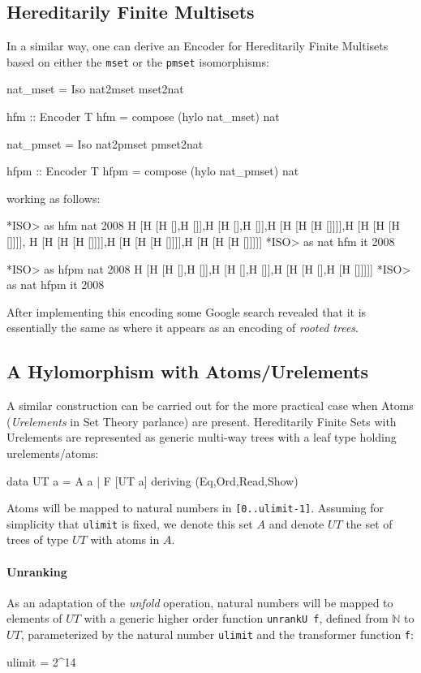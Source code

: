 \documentclass[]{INCLUDES/llncs}
\begin{document}
\subsection{Hereditarily Finite Multisets}
In a similar way, one can derive an Encoder for Hereditarily Finite Multisets
based on either the {\tt mset} or the {\tt pmset} isomorphisms:
\begin{code}
nat_mset = Iso nat2mset mset2nat

hfm :: Encoder T
hfm = compose (hylo nat_mset) nat

nat_pmset = Iso nat2pmset pmset2nat

hfpm :: Encoder T
hfpm = compose (hylo nat_pmset) nat
\end{code}
working as follows:
\begin{codex}
*ISO> as hfm nat 2008
H [H [H [],H []],H [H [],H []],H [H [H [H []]]],H [H [H [H []]]],
   H [H [H [H []]]],H [H [H [H []]]],H [H [H [H []]]]]
*ISO> as nat hfm it
2008

*ISO> as hfpm nat 2008
H [H [H [],H []],H [H [],H []],H [H [H [],H [H []]]]]
*ISO> as nat hfpm it
2008
\end{codex}
After implementing this encoding some Google search revealed that it is
essentially the same as \cite{DBLP:journals/jct/Gobel80} where
it appears as an encoding of {\em rooted trees}.

\subsection{A Hylomorphism with Atoms/Urelements}
A similar construction can be carried out for the
more practical case when Atoms ({\em Urelements}
in Set Theory parlance) are present.
Hereditarily Finite Sets with Urelements are
represented as generic multi-way trees with a
leaf type holding urelements/atoms:
\begin{code}
data UT a = A a | F [UT a] deriving (Eq,Ord,Read,Show)
\end{code}
Atoms will be mapped to natural numbers in {\tt [0..ulimit-1]}.
Assuming for simplicity that {\tt ulimit} is fixed, we 
denote this set $A$ and 
denote $UT$ the set of trees of type $UT$ with atoms in $A$.

\paragraph*{Unranking} As an adaptation of the {\em unfold} 
operation, natural numbers will be mapped to elements of $UT$ with a generic 
higher order function {\tt unrankU f}, defined from $\mathbb{N}$ to $UT$, 
parameterized by the natural number {\tt ulimit}
and the transformer function {\tt f}:
\begin{code}
ulimit = 2^14
\end{code}
\end{document}
